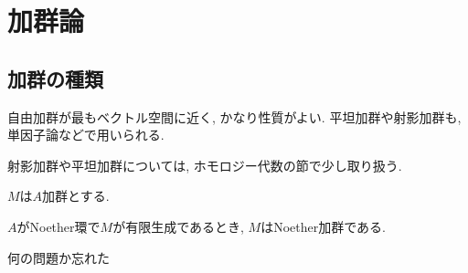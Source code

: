 \section{加群論}
\subsection{加群の種類}
自由加群が最もベクトル空間に近く, かなり性質がよい. 平坦加群や射影加群も, 単因子論などで用いられる.


射影加群や平坦加群については, ホモロジー代数の節で少し取り扱う.

\begin{prop} $M$は$A$加群とする.
\ben
\item
\item
\item $A$がNoether環で$M$が有限生成であるとき, $M$はNoether加群である.
\een
\end{prop}






\begin{egprob}
何の問題か忘れた
\end{egprob}

